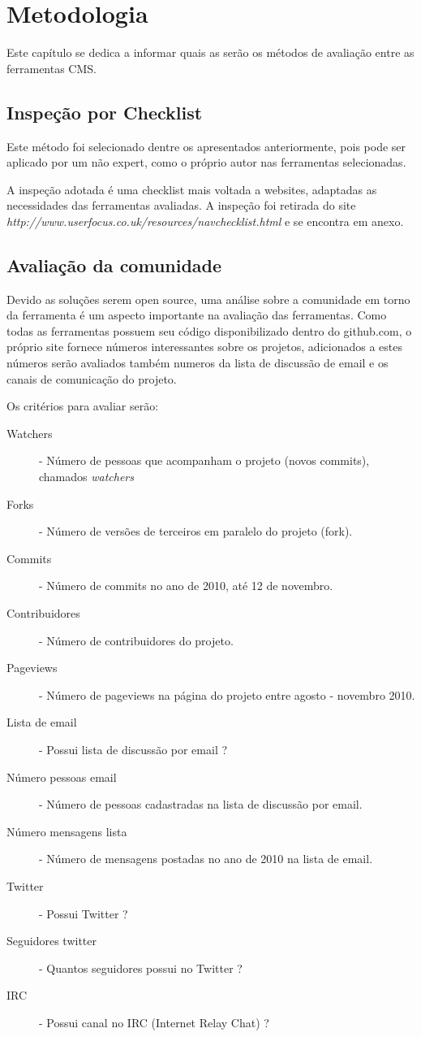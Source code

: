 \chapter{Metodologia}

Este capítulo se dedica a informar quais as serão os métodos de avaliação entre as ferramentas CMS.  

\section{Inspeção por Checklist}

Este método foi selecionado dentre os apresentados anteriormente, pois pode ser aplicado por um não expert, como o próprio autor nas ferramentas selecionadas.

A inspeção adotada é uma checklist mais voltada a websites, adaptadas as necessidades das ferramentas avaliadas. A inspeção foi retirada do site \emph{http://www.userfocus.co.uk/resources/navchecklist.html} e se encontra em anexo.

\section{Avaliação da comunidade}

Devido as soluções serem open source, uma análise sobre a comunidade em torno da ferramenta é um aspecto importante na avaliação das ferramentas. Como todas as ferramentas possuem seu código disponibilizado dentro do github.com, o próprio site fornece números interessantes sobre os projetos, adicionados a estes números serão avaliados também numeros da lista de discussão de email e os canais de comunicação do projeto.

Os critérios para avaliar serão:

\begin{description}
    \item[Watchers] - Número de pessoas que acompanham o projeto (novos commits), chamados \emph{watchers}
    \item[Forks] - Número de versões de terceiros em paralelo do projeto (fork).
    \item[Commits] - Número de commits no ano de 2010, até 12 de novembro.
    \item[Contribuidores] - Número de contribuidores do projeto.
    \item[Pageviews] - Número de pageviews na página do projeto entre agosto - novembro 2010.
    \item[Lista de email] - Possui lista de discussão por email ?
    \item[Número pessoas email] - Número de pessoas cadastradas na lista de discussão por email. 
    \item[Número mensagens lista] - Número de mensagens postadas no ano de 2010 na lista de email.
    \item[Twitter] - Possui Twitter ?
    \item[Seguidores twitter] - Quantos seguidores possui no Twitter ?
    \item[IRC] - Possui canal no IRC (Internet Relay Chat) ?
\end{description}



